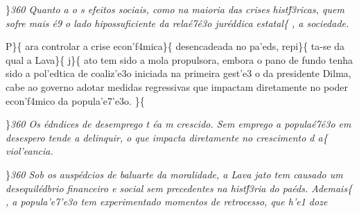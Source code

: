 \par \}\pard \ltrpar\qj {}\sl360\widctlpar\wrapdefault\faauto{} {\rtlch{}  \ltrch{}  \tab Quanto a}{\rtlch{}  \ltrch{}  o}{\rtlch{}  
\ltrch{}  s efeitos sociais, como na maioria das crises hist\'f3ricas, quem sofre mais \'e9 o lado hipossuficiente da }{\rtlch{}  \ltrch{}  rela\'e7\'e3o jur\'eddica estatal}\{\rtlch{}
 \ltrch{}  , a sociedade.
\par \tab P\}\{\rtlch{}  \ltrch{}  ara
controlar a crise econ'f4mica\}\{\rtlch{}  \ltrch{}
 desencadeada no pa'eds,
repi\}\{\rtlch{}  \ltrch{}  ta-se da qual a
Lava\}\{ \rtlch{}  \ltrch{}  j\}\{\rtlch{}
 \ltrch{}  ato tem sido a mola
propulsora, embora o pano de fundo tenha sido a pol'edtica de coaliz'e3o
iniciada na primeira gest'e3 o da presidente Dilma, cabe ao governo
adotar medidas regressivas que impactam diretamente no poder econ'f4mico
da popula'e7'e3o. \}\{\rtlch{}  \ltrch{} 
\par \}\pard \ltrpar\qj {}\sl360\widctlpar\wrapdefault\faauto{} {\rtlch{}  \ltrch{}  Os \'edndices de desemprego t}{\rtlch{}  \ltrch{}  
\'ea}{\rtlch{}  \ltrch{}  m crescido. Sem emprego a popula\'e7\'e3o em desespero tende a delinquir, o que impacta diretamente no crescimento d}{\rtlch{}  \ltrch{}  a}\{\rtlch{}
 \ltrch{}  viol'eancia.
\par \}\pard \ltrpar\qj {}\sl360\widctlpar\wrapdefault\faauto{} {\rtlch{}  \ltrch{}  \tab Sob os ausp\'edcios de}{\rtlch{}  \ltrch{}  
 baluarte da moralidade, a Lava}{\rtlch{}  \ltrch{}  jato tem causado um desequil\'edbrio financeiro e social sem precedentes na hist\'f3ria do pa\'eds. }{\rtlch{}  \ltrch{}  Ademais}\{
\rtlch{}  \ltrch{}  , a
popula'e7'e3o tem experimentado momentos de retrocesso, que h'e1 doze
